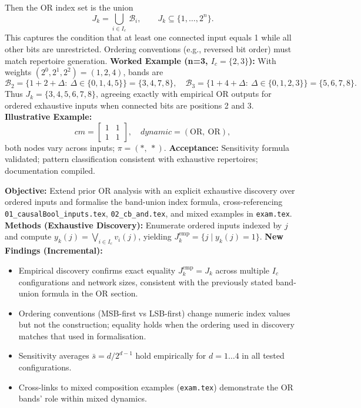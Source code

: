 Then the OR index set is the union
\[
J_k=\bigcup_{i\in I_c}\,\mathcal{B}_i,\qquad J_k\subseteq\{1,\dots,2^n\}.
\]
This captures the condition that at least one connected input equals 1 while all other bits are unrestricted. Ordering conventions (e.g., reversed bit order) must match repertoire generation.
\textbf{Worked Example (n=3, \(I_c=\{2,3\}\)):} With weights \((2^{0},2^{1},2^{2})=(1,2,4)\), bands are
\[
\mathcal{B}_2=\{1+2+\Delta:\ \Delta\in\{0,1,4,5\}\}=\{3,4,7,8\},\quad \mathcal{B}_3=\{1+4+\Delta:\ \Delta\in\{0,1,2,3\}\}=\{5,6,7,8\}.
\]
Thus \(J_k=\{3,4,5,6,7,8\}\), agreeing exactly with empirical OR outputs for ordered exhaustive inputs when connected bits are positions 2 and 3.
\textbf{Illustrative Example:}
\[
cm = \begin{bmatrix}1 & 1\\ 1 & 1\end{bmatrix},\quad dynamic=(\text{OR},\ \text{OR}),
\]
both nodes vary across inputs; \(\pi=(*,\ *)\).
\textbf{Acceptance:} Sensitivity formula validated; pattern classification consistent with exhaustive repertoires; documentation compiled.

\textbf{Objective:} Extend prior OR analysis with an explicit exhaustive discovery over ordered inputs and formalise the band-union index formula, cross-referencing \texttt{01\_causalBool\_inputs.tex}, \texttt{02\_cb\_and.tex}, and mixed examples in \texttt{exam.tex}.
\textbf{Methods (Exhaustive Discovery):} Enumerate ordered inputs indexed by \(j\) and compute \(y_k(j)=\bigvee_{i\in I_c} v_i(j)\), yielding \(J_k^{\mathrm{emp}}=\{j\mid y_k(j)=1\}\).
\textbf{New Findings (Incremental):}
\begin{itemize}
 \item Empirical discovery confirms exact equality \(J_k^{\mathrm{emp}}=J_k\) across multiple \(I_c\) configurations and network sizes, consistent with the previously stated band-union formula in the OR section.
 \item Ordering conventions (MSB-first vs LSB-first) change numeric index values but not the construction; equality holds when the ordering used in discovery matches that used in formalisation.
 \item Sensitivity averages \(\bar{s}=d/2^{d-1}\) hold empirically for \(d=1\dots 4\) in all tested configurations.
 \item Cross-links to mixed composition examples (\texttt{exam.tex}) demonstrate the OR bands’ role within mixed dynamics.
\end{itemize}



